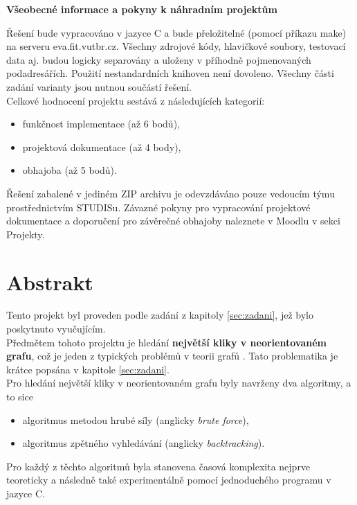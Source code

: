 \documentclass[a4paper]{article}
\begin{document}
    \noindent
    \textbf{Všeobecné informace a pokyny k náhradním projektům}
    
    \noindent
    Řešení bude vypracováno v jazyce C a bude přeložitelné (pomocí příkazu make) na serveru eva.fit.vutbr.cz. Všechny zdrojové kódy, hlavičkové soubory, testovací data aj. budou logicky separovány a uloženy v příhodně pojmenovaných podadresářích. Použití nestandardních knihoven není dovoleno. Všechny části zadání varianty jsou nutnou součástí řešení.\\
    
    \noindent
    Celkové hodnocení projektu sestává z následujících kategorií:
    \begin{itemize}
        \item funkčnost implementace (až 6 bodů),
        \item projektová dokumentace (až 4 body),
        \item obhajoba (až 5 bodů).
    \end{itemize}
    
    \noindent
    Řešení zabalené v jediném ZIP archivu je odevzdáváno pouze vedoucím týmu prostřednictvím STUDISu. Závazné pokyny pro vypracování projektové dokumentace a doporučení pro závěrečné obhajoby naleznete v Moodlu v sekci Projekty.
    
\section{Abstrakt} \label{sec:abstrakt}
    Tento projekt byl proveden podle zadání z kapitoly \ref{sec:zadani}, jež bylo poskytnuto vyučujícím.\\
    
    \noindent
    Předmětem tohoto projektu je hledání \textbf{největší kliky v neorientovaném grafu}, což je jeden z typických problémů v teorii grafů \cite{max-cliq}. Tato problematika je krátce popsána v kapitole \ref{sec:zadani}.\\
    
    \noindent
    Pro hledání největší kliky v neorientovaném grafu byly navrženy dva algoritmy, a to sice
    \begin{itemize}
        \item algoritmus metodou hrubé síly (anglicky \textit{brute force}),
        \item algoritmus zpětného vyhledávání (anglicky \textit{backtracking}).
    \end{itemize}
    Pro každý z těchto algoritmů byla stanovena časová komplexita nejprve teoreticky a následně také experimentálně pomocí jednoduchého programu v jazyce C.
    
\end{document}
